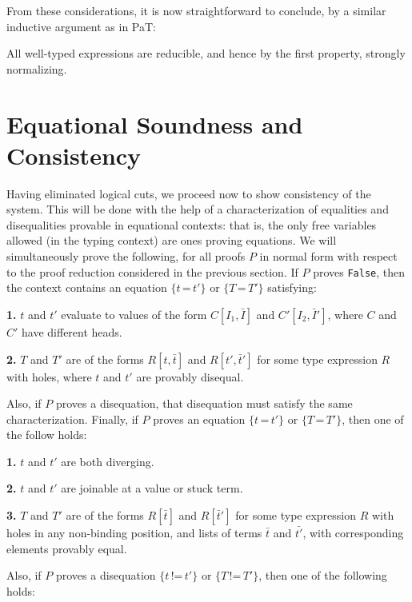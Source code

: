 \documentclass{fundam}
\newcommand{\Eq}[0]{\texttt{=}}
\newcommand{\Neq}[0]{\texttt{!=}}
\begin{document}
From these considerations, it is now straightforward to conclude,
by a similar inductive argument as in PaT:

\begin{theorem}
All well-typed expressions are reducible, and hence by the first
property, strongly normalizing.
\end{theorem}

\section{Equational Soundness and Consistency}

Having eliminated logical cuts, we proceed now to show consistency of
the system.  This will be done with the help of a characterization of
equalities and disequalities provable in equational contexts: that is,
the only free variables allowed (in the typing context) are ones
proving equations.  We will simultaneously prove the following, for
all proofs $P$ in normal form with respect to the proof reduction
considered in the previous section.  If $P$ proves \texttt{False},
then the context contains an equation $\{t\, \Eq\, t'\}$ or
$\{T\,\Eq\, T'\}$ satisfying:

\noindent
\textbf{1.} $t$ and $t'$ evaluate to values of the form
$C[I_1,\bar{I}]$ and $C'[I_2,\bar{I}']$, where $C$ and $C'$ have
different heads.

\noindent
\textbf{2.} $T$ and $T'$ are of the forms $R[t,\bar{t}]$ and
$R[t',\bar{t}']$ for some type expression $R$ with holes, where
$t$ and $t'$ are provably disequal.

\noindent Also, if $P$ proves a disequation, that disequation must
satisfy the same characterization.  Finally, if $P$ proves an equation
$\{t\, \Eq\, t'\}$ or $\{T\,\Eq\, T'\}$, then one of the follow holds:

\noindent
\textbf{1.} $t$ and $t'$ are both diverging.

\noindent
\textbf{2.} $t$ and $t'$ are joinable at a value or stuck term.

\noindent 
\textbf{3.} $T$ and $T'$ are of the forms $R[\bar{t}]$ and $R[\bar{t}']$ for
some type expression $R$ with holes in any non-binding position, and
lists of terms $\bar{t}$ and $\bar{t'}$, with corresponding elements
provably equal.

Also, if $P$ proves a disequation $\{t\, \Neq\, t'\}$ or $\{T\,\Neq\,
T'\}$, then one of the following holds:
\end{document}
